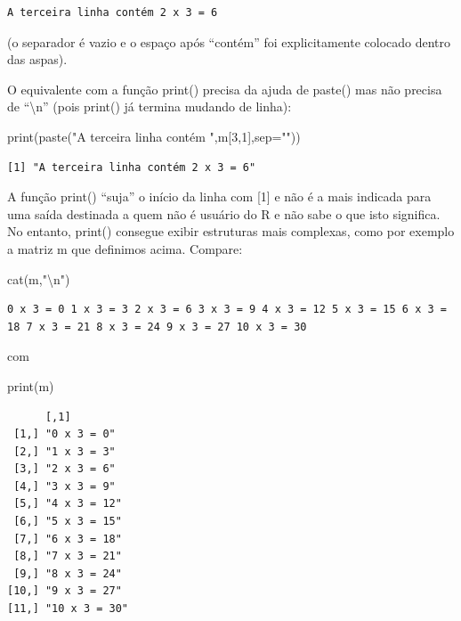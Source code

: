 \documentclass[
]{article}
\newenvironment{Shaded}{\begin{snugshade}}{\end{snugshade}}
\newcommand{\AttributeTok}[1]{\textcolor[rgb]{0.77,0.63,0.00}{#1}}
\newcommand{\DecValTok}[1]{\textcolor[rgb]{0.00,0.00,0.81}{#1}}
\newcommand{\FunctionTok}[1]{\textcolor[rgb]{0.00,0.00,0.00}{#1}}
\newcommand{\NormalTok}[1]{#1}
\newcommand{\SpecialCharTok}[1]{\textcolor[rgb]{0.00,0.00,0.00}{#1}}
\newcommand{\StringTok}[1]{\textcolor[rgb]{0.31,0.60,0.02}{#1}}
\begin{document}
\begin{verbatim}
A terceira linha contém 2 x 3 = 6
\end{verbatim}

(o separador é vazio e o espaço após ``contém'' foi explicitamente
colocado dentro das aspas).

O equivalente com a função print() precisa da ajuda de paste() mas não
precisa de ``\textbackslash n'' (pois print() já termina mudando de
linha):

\begin{Shaded}
\begin{Highlighting}[]
\FunctionTok{print}\NormalTok{(}\FunctionTok{paste}\NormalTok{(}\StringTok{"A terceira linha contém "}\NormalTok{,m[}\DecValTok{3}\NormalTok{,}\DecValTok{1}\NormalTok{],}\AttributeTok{sep=}\StringTok{""}\NormalTok{))}
\end{Highlighting}
\end{Shaded}

\begin{verbatim}
[1] "A terceira linha contém 2 x 3 = 6"
\end{verbatim}

A função print() ``suja'' o início da linha com {[}1{]} e não é a mais
indicada para uma saída destinada a quem não é usuário do R e não sabe o
que isto significa. No entanto, print() consegue exibir estruturas mais
complexas, como por exemplo a matriz m que definimos acima. Compare:

\begin{Shaded}
\begin{Highlighting}[]
\FunctionTok{cat}\NormalTok{(m,}\StringTok{"}\SpecialCharTok{\textbackslash{}n}\StringTok{"}\NormalTok{)}
\end{Highlighting}
\end{Shaded}

\begin{verbatim}
0 x 3 = 0 1 x 3 = 3 2 x 3 = 6 3 x 3 = 9 4 x 3 = 12 5 x 3 = 15 6 x 3 = 18 7 x 3 = 21 8 x 3 = 24 9 x 3 = 27 10 x 3 = 30 
\end{verbatim}

com

\begin{Shaded}
\begin{Highlighting}[]
\FunctionTok{print}\NormalTok{(m)}
\end{Highlighting}
\end{Shaded}

\begin{verbatim}
      [,1]         
 [1,] "0 x 3 = 0"  
 [2,] "1 x 3 = 3"  
 [3,] "2 x 3 = 6"  
 [4,] "3 x 3 = 9"  
 [5,] "4 x 3 = 12" 
 [6,] "5 x 3 = 15" 
 [7,] "6 x 3 = 18" 
 [8,] "7 x 3 = 21" 
 [9,] "8 x 3 = 24" 
[10,] "9 x 3 = 27" 
[11,] "10 x 3 = 30"
\end{verbatim}
\end{document}
